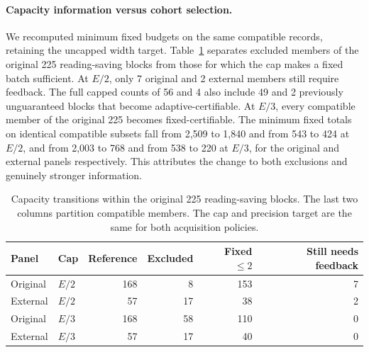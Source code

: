 \paragraph{Capacity information versus cohort selection.}
We recomputed minimum fixed budgets on the same compatible records, retaining
the uncapped width target. Table~\ref{tab:paired-capacity} separates excluded
members of the original 225 reading-saving blocks from those for which the
cap makes a fixed batch sufficient. At $E/2$, only 7 original and 2 external
members still require feedback. The full capped counts of 56 and 4 also
include 49 and 2 previously unguaranteed blocks that become adaptive-certifiable.
At $E/3$, every compatible member of the original 225 becomes fixed-certifiable.
The minimum fixed totals on identical compatible subsets fall from 2,509 to
1,840 and from 543 to 424 at $E/2$, and from 2,003 to 768 and from 538 to 220
at $E/3$, for the original and external panels respectively. This attributes
the change to both exclusions and genuinely stronger information.

\begin{table}[htbp]\centering\small
\caption{Capacity transitions within the original 225 reading-saving blocks.
The last two columns partition compatible members. The cap and precision
target are the same for both acquisition policies.}
\label{tab:paired-capacity}
\begin{tabular}{llrrrr}\toprule
Panel & Cap & Reference & Excluded & Fixed $\leq2$ & Still needs feedback\\\midrule
Original & $E/2$ & 168 & 8 & 153 & 7\\
External & $E/2$ & 57 & 17 & 38 & 2\\
Original & $E/3$ & 168 & 58 & 110 & 0\\
External & $E/3$ & 57 & 17 & 40 & 0\\\bottomrule
\end{tabular}
\end{table}
